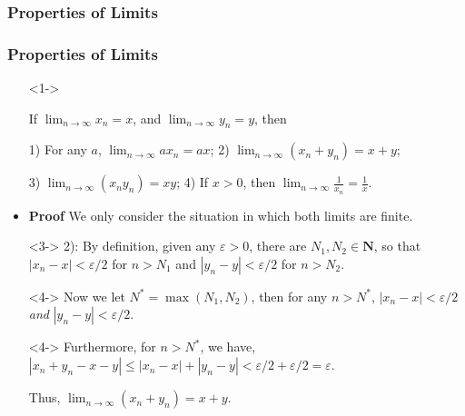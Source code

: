\documentclass[handout]{beamer}
\begin{document}
\subsubsection{Properties of Limits}

\frame
{
  \frametitle{Properties of Limits}

   \begin{itemize}
  \item [] <1-> \begin{Theorem} If $\lim_{n\rightarrow\infty} x_n=x$, and $\lim_{n\rightarrow\infty} y_n=y$, then 
  
  1) For any $a$, $\lim_{n\rightarrow\infty} a x_n=ax$; 2) $\lim_{n\rightarrow\infty} (x_n+y_n)=x+y$; 
  
  3) $\lim_{n\rightarrow\infty} (x_ny_n)=xy$; 4) If $x>0$, then $\lim_{n\rightarrow\infty} \frac{1}{x_n}=\frac{1}{x}$.
   \end{Theorem} 
    
      \item<2-> \textbf{Proof} We only consider the situation in which both limits are finite. 

    \item[]<3->  2): By definition, given any $\varepsilon>0$, there are $N_1, N_2\in \mathbf{N}$, so that $|x_n-x|<\varepsilon/2$ for $n>N_1$ and $|y_n-y|<\varepsilon/2$ for $n>N_2$.
        \item[]<4-> Now we let $N^*=\max(N_1, N_2)$, then for any $n>N^*$, $|x_n-x|<\varepsilon/2$ \textit{ and } $|y_n-y|<\varepsilon/2$.

        \item[]<4-> Furthermore, for $n>N^*$, we have, $|x_n+y_n-x-y|\leq |x_n-x|+|y_n-y|<\varepsilon/2+\varepsilon/2=\varepsilon$. 
        
        Thus, $\lim_{n\rightarrow\infty} (x_n+y_n)=x+y$.
        
        
  \end{itemize}
}
\end{document}
